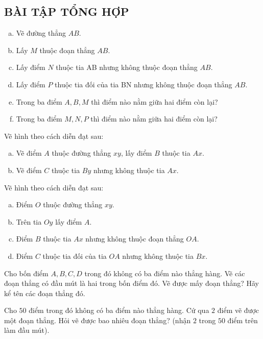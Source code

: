 \begin{bt}
\subsection{BÀI TẬP TỔNG HỢP}
\end{bt}   \begin{bt}
\begin{enumerate}[a)]
\item	Vẽ đường thẳng $AB$.
\item	Lấy $M$ thuộc đoạn thẳng $AB$.
\item	Lấy điểm $N$ thuộc tia AB nhưng không thuộc đoạn thẳng $AB$.
\item	Lấy điểm $P$ thuộc tia đối của tia BN nhưng không thuộc đoạn thẳng $AB$.
\item	Trong ba điểm $A, B, M$ thì điểm nào nằm giữa hai điểm còn lại?
\item	Trong ba điểm $M, N, P$ thì điểm nào nằm giữa hai điểm còn lại?
\end{enumerate}
\end{bt}   \begin{bt}
Vẽ hình theo cách diễn đạt sau:
\begin{enumerate}[a)]
\item	Vẽ điểm $A$ thuộc đường thẳng $xy$, lấy điểm $B$ thuộc tia $Ax$.
\item	Vẽ điểm $C$ thuộc tia $By$ nhưng không thuộc tia $Ax$.
\end{enumerate}
\end{bt}   \begin{bt}
Vẽ hình theo cách diễn đạt sau:
\begin{enumerate}[a)]
\item Điểm $O$ thuộc đường thẳng $xy$.
\item Trên tia $Oy$ lấy điểm $A$.
\item  Điểm $B$ thuộc tia $Ax$ nhưng không thuộc đoạn thẳng $OA$.
\item Điểm $C$ thuộc tia đối của tia $OA$ nhưng không thuộc tia $Bx$.
\end{enumerate}
\end{bt}   \begin{bt}
Cho bốn điểm $A, B, C, D$ trong đó không có ba điểm nào thẳng hàng. Vẽ các đoạn thẳng có đầu mút là hai trong bốn điểm đó. Vẽ được mấy đoạn thẳng? Hãy kể tên các đoạn thẳng đó.
\end{bt}   \begin{bt}
Cho $50$ điểm trong đó không có ba điểm nào thẳng hàng. Cứ qua $2$ điểm vẽ được một đoạn thẳng. Hỏi vẽ được bao nhiêu đoạn thẳng? (nhận $2$ trong $50$ điểm trên làm đầu mút).

\end{bt}
